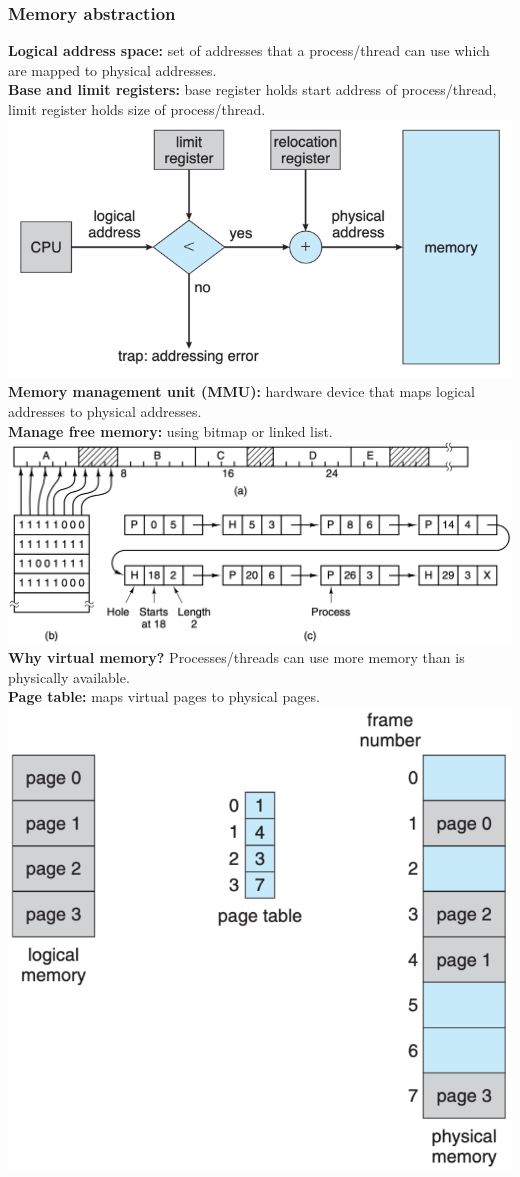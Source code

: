 \subsubsection{Memory abstraction}
\textbf{Logical address space:} set of addresses that a process/thread can use which are mapped to physical addresses.\\
\textbf{Base and limit registers:} base register holds start address of process/thread, limit register holds size of process/thread.\\
\includegraphics[width=\linewidth]{figs/base-and-limit-registers.png}
\textbf{Memory management unit (MMU):} hardware device that maps logical addresses to physical addresses.\\
\textbf{Manage free memory:} using bitmap or linked list.\\
\includegraphics[width=\linewidth]{figs/memory-management.png}
\textbf{Why virtual memory?} Processes/threads can use more memory than is physically available.\\
\textbf{Page table:} maps virtual pages to physical pages.\\
\includegraphics[width=0.6\linewidth]{figs/paging-model.png}\\
